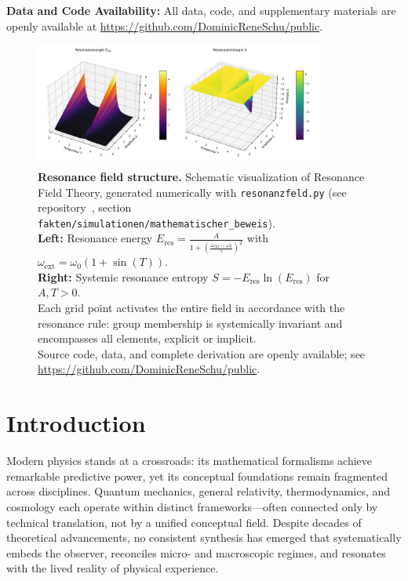 \documentclass[12pt]{iopart}
\newcommand{\dataavailability}{\textbf{Data and Code Availability:} All data, code, and supplementary materials are openly available at \url{https://github.com/DominicReneSchu/public}.}
\begin{document}
	\dataavailability
	
	\begin{figure}[ht]
		\centering
		\includegraphics[width=0.85\textwidth]{figures/plot.png}
		\caption{
			\textbf{Resonance field structure.}
			Schematic visualization of Resonance Field Theory, generated numerically with \texttt{resonanzfeld.py} (see repository~\cite{rftrepo}, section \texttt{fakten/simulationen/mathematischer\_beweis}).\\
			\textbf{Left:} Resonance energy $E_{\mathrm{res}} = \frac{A}{1 + \left(\frac{\omega_\mathrm{ext} - \omega_0}{\gamma}\right)^2}$ with $\omega_\mathrm{ext} = \omega_0 (1 + \sin(T))$.\\
			\textbf{Right:} Systemic resonance entropy $S = -E_{\mathrm{res}}\ln(E_{\mathrm{res}})$ for $A, T > 0$.\\
			Each grid point activates the entire field in accordance with the resonance rule: group membership is systemically invariant and encompasses all elements, explicit or implicit.\\
			Source code, data, and complete derivation are openly available; see \url{https://github.com/DominicReneSchu/public}.
		}
		\label{fig:resonance_field_plot}
	\end{figure}
	
	\section{Introduction}
	
	Modern physics stands at a crossroads: its mathematical formalisms achieve remarkable predictive power, yet its conceptual foundations remain fragmented across disciplines. Quantum mechanics, general relativity, thermodynamics, and cosmology each operate within distinct frameworks—often connected only by technical translation, not by a unified conceptual field. Despite decades of theoretical advancements, no consistent synthesis has emerged that systematically embeds the observer, reconciles micro- and macroscopic regimes, and resonates with the lived reality of physical experience.
	
\end{document}
